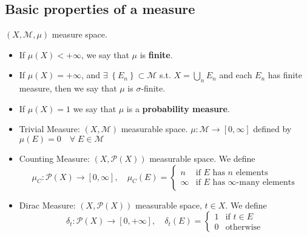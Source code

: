 \subsection{Basic properties of a measure}
\begin{definition}
    \((X, \mathcal{M}, \mu)\) measure space. 
    \begin{itemize}
    \item If \(\mu(X) < +\infty\), we say that \(\mu\) is \textbf{finite}.

    \item If \(\mu (X) = +\infty\), and \(\exists \; \left\lbrace E_n \right\rbrace \subset \mathcal{M}\) s.t. \(X = \bigcup_n E_n\) and each \(E_n\) has finite measure, then we say that \(\mu\) is \(\sigma\)-finite. 

    \item If \(\mu(X) = 1\) we say that \(\mu\) is a \textbf{probability measure}.
    \end{itemize}
\end{definition}
    \begin{example}
        \begin{itemize}
            \item Trivial Measure: \((X, \mathcal{M})\) measurable space. \(\mu : \mathcal{M} \to [0, \infty]\) defined by \(\mu(E) = 0 \quad \forall \; E \in \mathcal{M}\) 
            \item Counting Measure: \((X, \mathcal{P}(X))\) measurable space. We define 
            \[
                \mu_C :  \mathcal{P}(X) \to [0, \infty], \quad \mu_C (E) = \begin{cases}
                    n & \mbox{if } E \mbox{ has } n \mbox{ elements} \\
                    \infty &  \mbox{if } E \mbox{ has } \infty \mbox{-many elements} 
                \end{cases}
            \]
            \item Dirac Measure: \((X, \mathcal{P}(X))\) measurable space, \(t \in X\). We define 
            \[
                \delta_t  :  \mathcal{P}(X) \to [0, +\infty], \quad \delta_t(E) = \begin{cases}
                    1 & \mbox{if } t \in E\\
                    0 & \mbox{otherwise}
                \end{cases}
            \]
        \end{itemize}
    \end{example}
